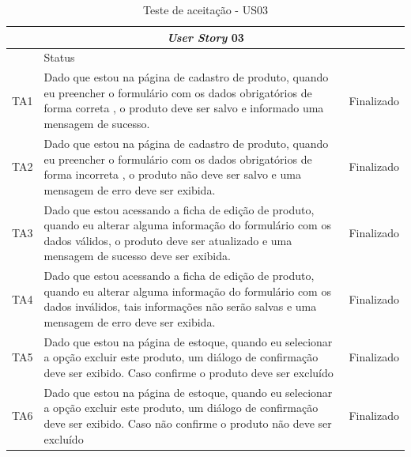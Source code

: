 \documentclass[a4paper,12pt]{monografia}
\begin{document}
\begin{longtable}{|l|p{11.8cm}|c|}
\caption{Teste de aceitação - US03}
\label{quadro:teste-aceitacao-us03}
\hline
\multicolumn{3}{|c|}{\textbf{\textit{User Story} 03}}\\
\hline		
\rowcolor{ballblue}
\multicolumn{2}{|c|}{Testes de aceitação} & Status\\	
\hline
TA1 & Dado que estou na página de cadastro de produto, quando eu preencher o formulário com os dados obrigatórios de forma correta , o produto deve ser salvo e informado uma mensagem de sucesso.   & Finalizado\\
\hline
TA2 & Dado que estou na página de cadastro de produto, quando eu preencher o formulário com os dados obrigatórios de forma incorreta , o produto não deve ser salvo e uma mensagem de erro deve ser exibida.   & Finalizado\\
\hline
TA3 & Dado que estou acessando a ficha de edição de produto, quando eu alterar alguma informação do formulário com os dados válidos, o produto deve ser atualizado e uma mensagem de sucesso deve ser exibida.   & Finalizado\\
\hline
TA4 & Dado que estou acessando a ficha de edição de produto, quando eu alterar alguma informação do formulário com os dados inválidos, tais informações não serão salvas e uma mensagem de erro deve ser exibida.   & Finalizado\\
\hline
TA5 & Dado que estou na página de estoque, quando eu selecionar a opção excluir este produto, um diálogo de confirmação deve ser exibido. Caso confirme o produto deve ser excluído  & Finalizado\\
\hline
TA6 & Dado que estou na página de estoque, quando eu selecionar a opção excluir este produto, um diálogo de confirmação deve ser exibido. Caso não confirme o produto não deve ser excluído  & Finalizado\\
\hline
\end{longtable}
\end{document}
